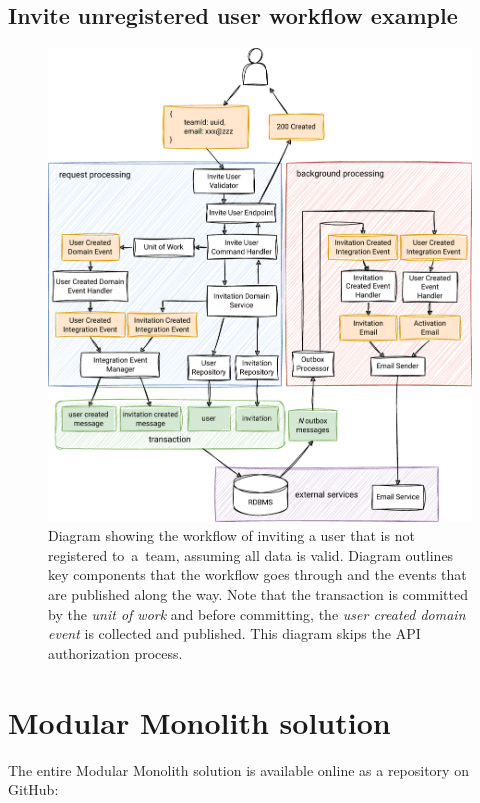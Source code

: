 \subsection{Invite unregistered user workflow example}

\begin{figure} [H]
    \centering
    \includegraphics[width=\textwidth]{figures/ca-workflow.pdf}
    \caption{Diagram showing the workflow of inviting a user that is not registered to~a~team, assuming all data is valid. Diagram outlines key components that the workflow goes through and the events that are published along the way. Note that the transaction is committed by the \textit{unit of work} and before committing, the \textit{user created domain event} is collected and published. This diagram skips the API authorization process.}
    \label{fig:ca_workflow}
\end{figure}

\newpage
\section{Modular Monolith solution}
\label{dev:modular_monolith}
The entire Modular Monolith solution is available online as a repository on GitHub:

